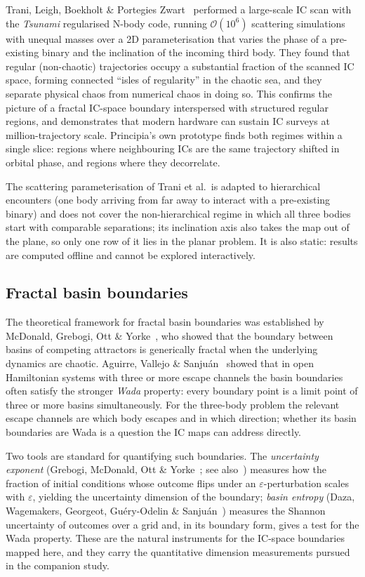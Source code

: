 \documentclass[11pt,a4paper]{article}
\begin{document}
Trani, Leigh, Boekholt \& Portegies Zwart~\cite{trani2024} performed a large-scale IC scan with
the \emph{Tsunami} regularised N-body code, running $\mathcal{O}(10^6)$ scattering simulations
with unequal masses over a 2D parameterisation that varies the phase of a pre-existing binary and
the inclination of the incoming third body.  They found that regular (non-chaotic) trajectories occupy a substantial
fraction of the scanned IC space, forming connected ``isles of regularity'' in the chaotic sea,
and they separate physical chaos from numerical chaos in doing so.  This confirms the picture of
a fractal IC-space boundary interspersed with structured regular regions, and demonstrates that
modern hardware can sustain IC surveys at million-trajectory scale.  Principia's own prototype
finds both regimes within a single slice: regions where neighbouring ICs are the same trajectory
shifted in orbital phase, and regions where they decorrelate.

The scattering parameterisation of Trani et al.\ is adapted to hierarchical encounters (one body
arriving from far away to interact with a pre-existing binary) and does not cover the
non-hierarchical regime in which all three bodies start with comparable separations; its
inclination axis also takes the map out of the plane, so only one row of it lies in the planar
problem.  It is also
static: results are computed offline and cannot be explored interactively.

\subsection{Fractal basin boundaries}
\label{sec:fractal}

The theoretical framework for fractal basin boundaries was established by McDonald, Grebogi, Ott
\& Yorke~\cite{mcdonald1985}, who showed that the boundary between basins of competing attractors
is generically fractal when the underlying dynamics are chaotic.  Aguirre, Vallejo \&
Sanju\'{a}n~\cite{aguirre2001} showed that in open Hamiltonian systems with three or more escape
channels the basin boundaries often satisfy the stronger \emph{Wada} property: every boundary
point is a limit point of three or more basins simultaneously.  For the three-body problem the
relevant escape channels are which body escapes and in which direction; whether its basin
boundaries are Wada is a question the IC maps can address directly.

Two tools are standard for quantifying such boundaries.  The \emph{uncertainty exponent}
(Grebogi, McDonald, Ott \& Yorke~\cite{grebogi1983}; see also~\cite{mcdonald1985}) measures how
the fraction of initial conditions whose outcome flips under an $\varepsilon$-perturbation scales
with $\varepsilon$, yielding the uncertainty dimension of the boundary; \emph{basin entropy}
(Daza, Wagemakers, Georgeot, Gu\'{e}ry-Odelin \& Sanju\'{a}n~\cite{daza2016}) measures the Shannon
uncertainty of outcomes over a grid and, in its boundary form, gives a test for the Wada property.
These are the natural instruments for the IC-space boundaries mapped here, and they carry the
quantitative dimension measurements pursued in the companion study.
\end{document}
